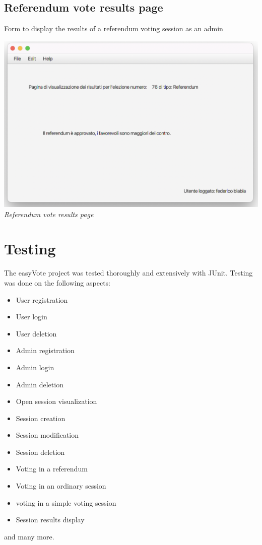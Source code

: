 \documentclass[11pt, oneside]{article}   	%
\begin{document}
\subsection{Referendum vote results page}
Form to display the results of a referendum voting session as an admin
\begin{center}
    \includegraphics[scale=0.45]{images/ui14.png}\\
    \emph{Referendum vote results page}
    \end{center}

\pagebreak

\section{Testing}

The easyVote project was tested thoroughly and extensively with JUnit.
Testing was done on the following aspects:
\begin{itemize}
    \item User registration
    \item User login
    \item User deletion
    \item Admin registration
    \item Admin login
    \item Admin deletion
    \item Open session visualization
    \item Session creation
    \item Session modification
    \item Session deletion
    \item Voting in a referendum
    \item Voting in an ordinary session
    \item voting in a simple voting session
    \item Session results display
\end{itemize}
and many more.
\end{document}
